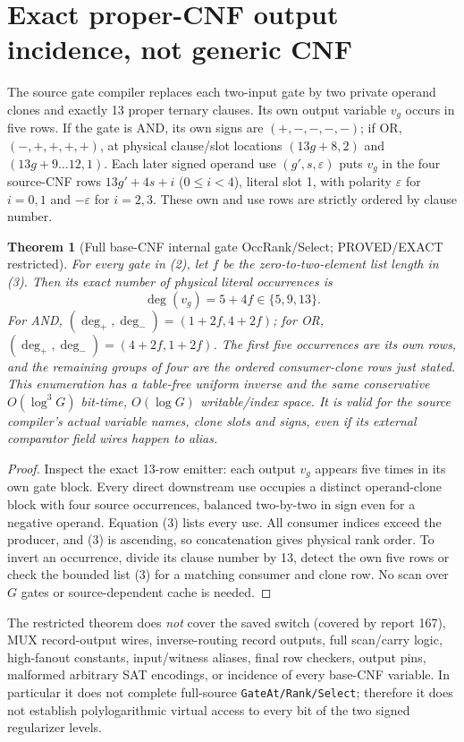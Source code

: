 \documentclass[11pt]{article}
\newtheorem{theorem}{Theorem}
\begin{document}
\section{Exact proper-CNF output incidence, not generic CNF}
The source gate compiler replaces each two-input gate by two private operand clones and exactly 13 proper ternary clauses. Its own output variable $v_g$ occurs in five rows. If the gate is AND, its own signs are $(+,-,-,-,-)$; if OR, $(-,+,+,+,+)$, at physical clause/slot locations $(13g+8,2)$ and $(13g+9\ldots12,1)$. Each later signed operand use $(g',s,\varepsilon)$ puts $v_g$ in the four source-CNF rows $13g'+4s+i$ ($0\le i<4$), literal slot 1, with polarity $\varepsilon$ for $i=0,1$ and $-\varepsilon$ for $i=2,3$. These own and use rows are strictly ordered by clause number.

\begin{theorem}[Full base-CNF internal gate OccRank/Select; PROVED/EXACT restricted]
For every gate in (2), let $f$ be the zero-to-two-element list length in (3). Then its exact number of physical literal occurrences is
\[
\boxed{\deg(v_g)=5+4f\in\{5,9,13\}}.\tag{4}
\]
For AND, $(\deg_+,\deg_-)=(1+2f,4+2f)$; for OR, $(\deg_+,\deg_-)=(4+2f,1+2f)$. The first five occurrences are its own rows, and the remaining groups of four are the ordered consumer-clone rows just stated. This enumeration has a table-free uniform inverse and the same conservative $O(\log^3G)$ bit-time, $O(\log G)$ writable/index space. It is valid for the source compiler's \emph{actual} variable names, clone slots and signs, even if its external comparator field wires happen to alias.
\end{theorem}
\begin{proof}
Inspect the exact 13-row emitter: each output $v_g$ appears five times in its own gate block. Every direct downstream use occupies a distinct operand-clone block with four source occurrences, balanced two-by-two in sign even for a negative operand. Equation (3) lists every use. All consumer indices exceed the producer, and (3) is ascending, so concatenation gives physical rank order. To invert an occurrence, divide its clause number by 13, detect the own five rows or check the bounded list (3) for a matching consumer and clone row. No scan over $G$ gates or source-dependent cache is needed.\end{proof}

The restricted theorem does \emph{not} cover the saved switch (covered by report 167), MUX record-output wires, inverse-routing record outputs, full scan/carry logic, high-fanout constants, input/witness aliases, final row checkers, output pins, malformed arbitrary SAT encodings, or incidence of every base-CNF variable. In particular it does not complete full-source \texttt{GateAt/Rank/Select}; therefore it does not establish polylogarithmic virtual access to every bit of the two signed regularizer levels.
\end{document}
